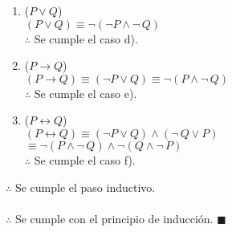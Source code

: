 \documentclass[11pt,letterpaper]{article}
\renewcommand\qedsymbol{$\blacksquare$}
\begin{document}
\begin{enumerate}
\begin{enumerate}
           \item ($ P \vee Q $) \\
             $ (P \vee Q) \equiv \neg (\neg P \wedge \neg \, Q) $ \\
             $ \therefore $ Se cumple el caso d).

           \item ($ P \rightarrow Q $) \\
             $ (P \rightarrow Q) \equiv (\neg P \vee Q) \equiv \neg (P \wedge \neg \, Q) $ \\
             $ \therefore $ Se cumple el caso e).

           \item ($ P \longleftrightarrow Q $)\\
             $ (P \longleftrightarrow Q) \equiv (\neg P \vee Q) \wedge (\neg \, Q \vee P) $ \\
             $ \equiv \neg (P \wedge \neg \, Q) \wedge \neg (Q \wedge \neg \, P) $ \\
             $ \therefore $ Se cumple el caso f).

           \end{enumerate}

           $ \therefore $ Se cumple el paso inductivo. \\ \\
           $ \therefore $ Se cumple con el principio de inducción. \qedsymbol

         \end{enumerate}
\end{document}
